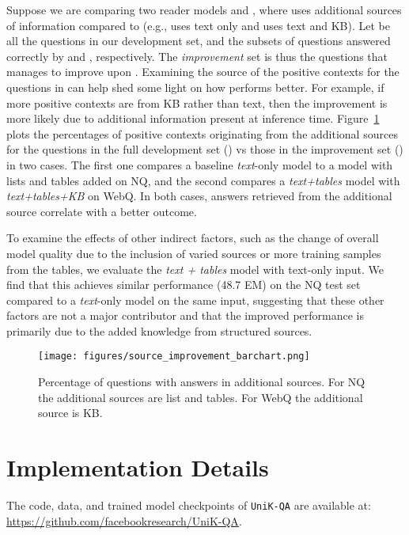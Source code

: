 \documentclass[11pt]{article}
\newcommand{\uniqa}{\texttt{UniK-QA}\xspace}
\begin{document}
Suppose we are comparing two reader models  and , where  uses additional sources of information compared to  (e.g.,  uses text only and  uses text and KB).
Let  be all the questions in our development set,  and  the subsets of questions answered correctly by  and , respectively.
The \emph{improvement} set  is thus the questions that  manages to improve upon .
Examining the source of the positive contexts for the questions in  can help shed some light on how  performs better.
For example, if more positive contexts are from KB rather than text, then the improvement is more likely due to additional information present at inference time.
Figure~\ref{fig:source_improvement_barchart} plots the percentages of positive contexts originating from the additional sources for the questions in the full development set () vs those in the improvement set () in two cases. 
The first one compares a baseline \emph{text}-only model to a model with lists and tables added on NQ, and
the second compares a \emph{text+tables} model with \emph{text+tables+KB} on WebQ.  
In both cases, answers retrieved from the additional source correlate with a better outcome. 

To examine the effects of other indirect factors, such as the change of overall model quality due to the inclusion of varied sources or more training samples from the tables, we evaluate the \emph{text + tables} model with text-only input.  
We find that this achieves similar performance (48.7 EM) on the NQ test set compared to a \emph{text}-only model on the same input, suggesting that these other factors are not a major contributor and that the improved performance is primarily due to the added knowledge from structured sources.


\begin{figure}[t]
    \centering
    \texttt{[image: figures/source\_improvement\_barchart.png]}
    \caption{Percentage of questions with answers in additional sources. For NQ the additional sources are list and tables. For WebQ the additional source is KB.}
    \label{fig:source_improvement_barchart}
    \vspace{-3mm}
\end{figure}


 
\section{Implementation Details}\label{sec:implementation}

The code, data, and trained model checkpoints of \uniqa{} are available at: \url{https://github.com/facebookresearch/UniK-QA}.
\end{document}

